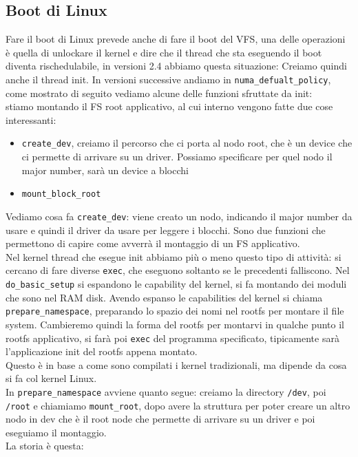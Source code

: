 \documentclass[12pt, oneside]{extbook}
\begin{document}
\subsection{Boot di Linux}
Fare il boot di Linux prevede anche di fare il boot del VFS, una delle operazioni è quella di unlockare il kernel e dire che il thread che sta eseguendo il boot diventa rischedulabile, in versioni 2.4 abbiamo questa situazione:
Creiamo quindi anche il thread init. In versioni successive andiamo in \texttt{numa\_defualt\_policy}, come mostrato di seguito
vediamo alcune delle funzioni sfruttate da init:\\
stiamo montando il FS root applicativo, al cui interno vengono fatte due cose interessanti:
\begin{itemize}
	\item \texttt{create\_dev}, creiamo il percorso che ci porta al nodo root, che è un device che ci permette di arrivare su un driver. Possiamo specificare per quel nodo il major number, sarà un device a blocchi
	\item \texttt{mount\_block\_root}
\end{itemize}
Vediamo cosa fa \texttt{create\_dev}:
viene creato un nodo, indicando il major number da usare e quindi il driver da usare per leggere i blocchi. Sono due funzioni che permettono di capire come avverrà il montaggio di un FS applicativo.\\Nel kernel thread che esegue init abbiamo più o meno questo tipo di attività:
si cercano di fare diverse \texttt{exec}, che eseguono soltanto se le precedenti falliscono. Nel \texttt{do\_basic\_setup} si espandono le capability del kernel, si fa montando dei moduli che sono nel RAM disk. Avendo espanso le capabilities del kernel si chiama \texttt{prepare\_namespace}, preparando lo spazio dei nomi nel rootfs per montare il file system. Cambieremo quindi la forma del rootfs per montarvi in qualche punto il rootfs applicativo, si farà poi \texttt{exec} del programma specificato, tipicamente sarà l'applicazione init del rootfs appena montato.\\Questo è in base a come sono compilati i kernel tradizionali, ma dipende da cosa si fa col kernel Linux.\\In \texttt{prepare\_namespace} avviene quanto segue:
creiamo la directory \texttt{/dev}, poi \texttt{/root} e chiamiamo \texttt{mount\_root}, dopo avere la struttura per poter creare un altro nodo in dev che è il root node che permette di arrivare su un driver e poi eseguiamo il montaggio.\\La storia è questa:
\end{document}
